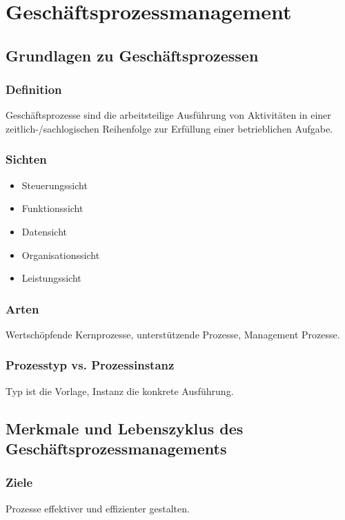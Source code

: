 \section{Geschäftsprozessmanagement}

\subsection{Grundlagen zu Geschäftsprozessen}
    \subsubsection*{Definition}
        Geschäftsprozesse sind die arbeitsteilige Ausführung von Aktivitäten in einer zeitlich-/sachlogischen Reihenfolge zur Erfüllung einer betrieblichen Aufgabe.
    \subsubsection*{Sichten}
        \begin{itemize}
            \item Steuerungssicht
            \item Funktionssicht
            \item Datensicht
            \item Organisationssicht
            \item Leistungssicht
        \end{itemize}
    \subsubsection*{Arten}
        Wertschöpfende Kernprozesse, unterstützende Prozesse, Management Prozesse.
    \subsubsection*{Prozesstyp vs. Prozessinstanz}
        Typ ist die Vorlage, Instanz die konkrete Ausführung.

\subsection{Merkmale und Lebenszyklus des Geschäftsprozessmanagements}
    \subsubsection*{Ziele}
        Prozesse effektiver und effizienter gestalten.
